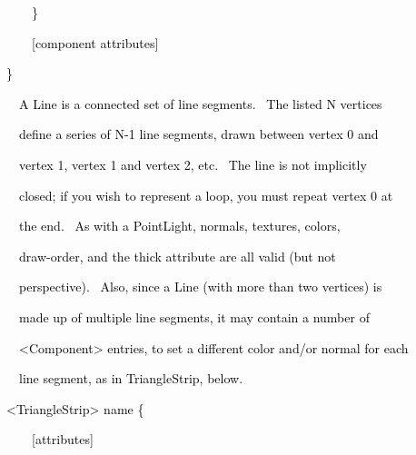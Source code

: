 \documentclass[a4paper]{article}
\newcommand\textstyleOOoComputerKeyWord[1]{\textrm{\textcolor[rgb]{0.0,0.0,0.5019608}{#1}}}
\begin{document}
{\color{black}
\textstyleOOoComputerKeyWord{\textcolor{black}{\ \ \ \ \} }}}

{\color{black}
\textstyleOOoComputerKeyWord{\textcolor{black}{\ \ \ \ [component attributes]}}}

{\color{black}
\textstyleOOoComputerKeyWord{\textcolor{black}{\}}}}


\bigskip

{\color{black}
\textstyleOOoComputerKeyWord{\textcolor{black}{\ \ A Line is a connected set of line segments. \ The listed N
vertices}}}

{\color{black}
\textstyleOOoComputerKeyWord{\textcolor{black}{\ \ define a series of N-1 line segments, drawn between vertex 0 and}}}

\clearpage
\bigskip

{\color{black}
\textstyleOOoComputerKeyWord{\textcolor{black}{\ \ vertex 1, vertex 1 and vertex 2, etc. \ The line is not implicitly}}}

{\color{black}
\textstyleOOoComputerKeyWord{\textcolor{black}{\ \ closed; if you wish to represent a loop, you must repeat vertex 0
at}}}

{\color{black}
\textstyleOOoComputerKeyWord{\textcolor{black}{\ \ the end. \ As with a PointLight, normals, textures, colors,}}}

{\color{black}
\textstyleOOoComputerKeyWord{\textcolor{black}{\ \ draw-order, and the {\textquotedbl}thick{\textquotedbl} attribute are
all valid (but not}}}

{\color{black}
\textstyleOOoComputerKeyWord{\textcolor{black}{\ \ {\textquotedbl}perspective{\textquotedbl}). \ Also, since a Line
(with more than two vertices) is}}}

{\color{black}
\textstyleOOoComputerKeyWord{\textcolor{black}{\ \ made up of multiple line segments, it may contain a number of}}}

{\color{black}
\textstyleOOoComputerKeyWord{\textcolor{black}{\ \ {\textless}Component{\textgreater} entries, to set a different color
and/or normal for each}}}

{\color{black}
\textstyleOOoComputerKeyWord{\textcolor{black}{\ \ line segment, as in TriangleStrip, below.}}}


\bigskip


\bigskip

{\color{black}
\textstyleOOoComputerKeyWord{\textcolor{black}{{\textless}TriangleStrip{\textgreater} name \{ }}}

{\color{black}
\textstyleOOoComputerKeyWord{\textcolor{black}{\ \ \ \ [attributes] }}}
\end{document}
